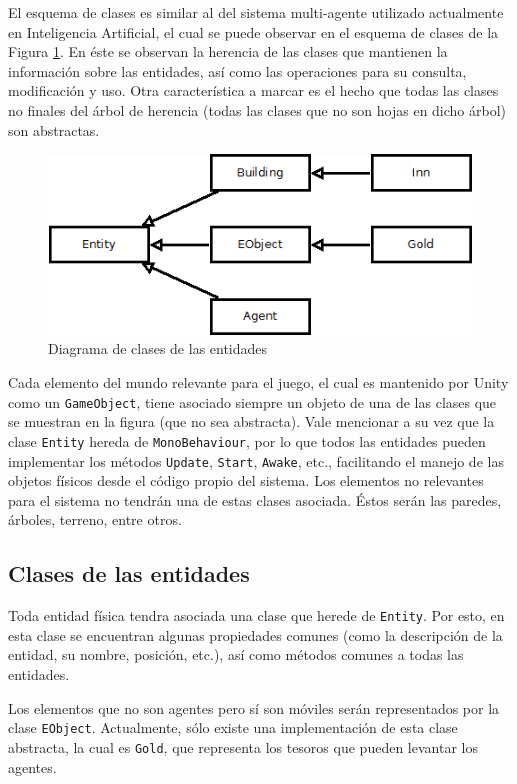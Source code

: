 \documentclass[a4paper,oneside]{article}
\begin{document}
El esquema de clases es similar al del sistema multi-agente utilizado actualmente en 
Inteligencia Artificial, el cual se puede observar en el esquema de clases de la Figura
\ref{fig:diagramaDeClasesEntidades}. En éste se observan la herencia de las clases que
mantienen la información sobre las entidades, así como las operaciones para su 
consulta, modificación y uso. Otra característica a marcar es el hecho que todas las 
clases no finales del árbol de herencia (todas las clases que no son hojas en dicho 
árbol) son abstractas.

\begin{figure}
 \centering
\includegraphics[width=.7\textwidth]{diagramaDeClasesEntidades}

 \caption{Diagrama de clases de las entidades}
 \label{fig:diagramaDeClasesEntidades}
\end{figure}

Cada elemento del mundo relevante para el juego, el cual es mantenido por Unity como un
\texttt{GameObject}, tiene asociado siempre un objeto de una de las clases que se 
muestran en la figura (que no sea abstracta). Vale mencionar a su vez que la clase
\texttt{Entity} hereda de \texttt{MonoBehaviour}, por lo que todos las entidades pueden
implementar los métodos \texttt{Update}, \texttt{Start}, \texttt{Awake}, etc., 
facilitando el manejo de las objetos físicos desde el código propio del sistema. Los 
elementos no relevantes para el sistema no tendrán una de estas clases asociada. Éstos
serán las paredes, árboles, terreno, entre otros.

\subsection{Clases de las entidades}

Toda entidad física tendra asociada una clase que herede de \texttt{Entity}. Por esto, en 
esta clase se encuentran algunas propiedades comunes (como la descripción de la entidad,
su nombre, posición, etc.), así como métodos comunes a todas las entidades.

Los elementos que no son agentes pero sí son móviles serán representados por la clase
\texttt{EObject}. Actualmente, sólo existe una implementación de esta clase abstracta, la
cual es \texttt{Gold}, que representa los tesoros que pueden levantar los agentes.
\end{document}
